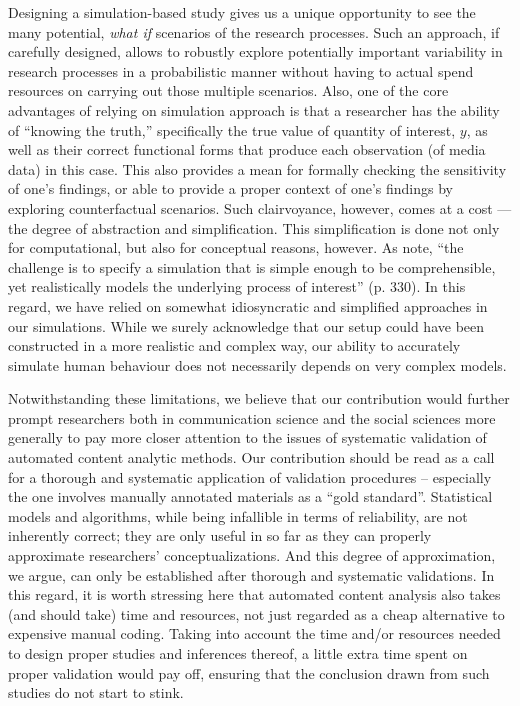 \documentclass[man, 12pt, a4paper, nolmodern, noextraspace]{apa6}
\begin{document}
    Designing a simulation-based study gives us a unique opportunity to see the many potential, \textit{what if} scenarios of the research processes. Such an approach, if carefully designed, allows to robustly explore potentially important variability in research processes in a probabilistic manner without having to actual spend resources on carrying out those multiple scenarios. Also, one of the core advantages of relying on simulation approach is that a researcher has the ability of \enquote{knowing the truth,} specifically the true value of quantity of interest, $y$, as well as their correct functional forms that produce each observation (of media data) in this case. This also provides a mean for formally checking the sensitivity of one's findings, or able to provide a proper context of one's findings by exploring counterfactual scenarios. Such clairvoyance, however, comes at a cost --- the degree of abstraction and simplification. This simplification is done not only for computational, but also for conceptual reasons, however. As \textcite{scharkow2017measurement} note, \enquote{the challenge is to specify a simulation that is simple enough to be comprehensible, yet realistically models the underlying process of interest} (p. 330). In this regard, we have relied on somewhat idiosyncratic and simplified approaches in our simulations. While we surely acknowledge that our setup could have been constructed in a more realistic and complex way, our ability to accurately simulate human behaviour does not necessarily depends on very complex models. 

    Notwithstanding these limitations, we believe that our contribution would further prompt researchers both in communication science and the social sciences more generally to pay more closer attention to the issues of systematic validation of automated content analytic methods. Our contribution should be read as a call for a thorough and systematic application of validation procedures -- especially the one involves manually annotated materials as a \enquote{gold standard}. Statistical models and algorithms, while being infallible in terms of reliability, are not inherently correct; they are only useful in so far as they can properly approximate researchers' conceptualizations. And this degree of approximation, we argue, can only be established after thorough and systematic validations. In this regard, it is worth stressing here that automated content analysis also takes (and should take) time and resources, not just regarded as a cheap alternative to expensive manual coding. Taking into account the time and/or resources needed to design proper studies and inferences thereof, a little extra time spent on proper validation would pay off, ensuring that the conclusion drawn from such studies do not start to stink.

    
\printbibliography
\end{document}
